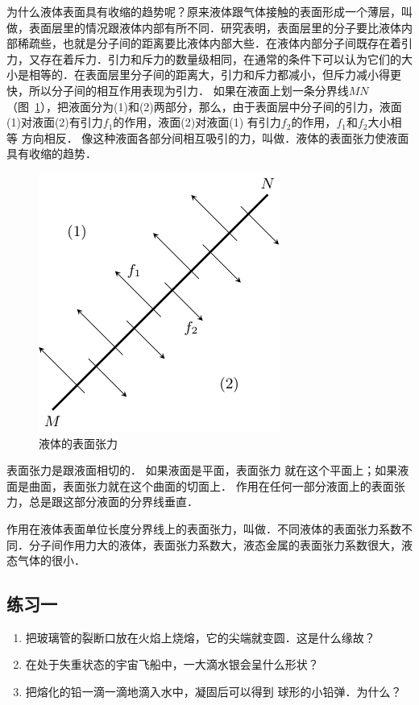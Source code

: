 为什么液体表面具有收缩的趋势呢？原来液体跟气体接触的表面形成一个薄层，叫做，表面层里的情况跟液体内部有所不同．研究表明，表面层里的分子要比液体内部稀疏些，也就是分子间的距离要比液体内部大些．在液体内部分子间既存在着引力，又存在着斥力．引力和斥力的数量级相同，在通常的条件下可以认为它们的大小是相等的．在表面层里分子间的距离大，引力和斥力都减小，但斥力减小得更快，所以分子间的相互作用表现为引力．
如果在液面上划一条分界线$MN$（图~\ref{fig_B_4-11}），把液面分为(1)和(2)两部分，那么，由于表面层中分子间的引力，液面(1)对液面(2)有引力$f_1$的作用，液面(2)对液面(1)
有引力$f_2$的作用，$f_1$和$f_2$大小相等
方向相反．
像这种液面各部分间相互吸引的力，叫做．液体的表面张力使液面具有收缩的趋势．
\begin{figure}[htbp]
    \centering
    \includegraphics{fig/B/4-11.pdf}
    \caption{液体的表面张力}\label{fig_B_4-11}
\end{figure}

表面张力是跟液面相切的．
如果液面是平面，表面张力
就在这个平面上；如果液面是曲面，表面张力就在这个曲面的切面上．
作用在任何一部分液面上的表面张力，总是跟这部分液面的分界线垂直．

作用在液体表面单位长度分界线上的表面张力，叫做．不同液体的表面张力系数不同．分子间作用力大的液体，表面张力系数大，液态金属的表面张力系数很大，液态气体的很小．

\subsection*{练习一}
\begin{enumerate}
\item 把玻璃管的裂断口放在火焰上烧熔，它的尖端就变圆．这是什么缘故？
\item 在处于失重状态的宇宙飞船中，一大滴水银会呈什么形状？
\item 把熔化的铅一滴一滴地滴入水中，凝固后可以得到
球形的小铅弹．为什么？
\end{enumerate}

